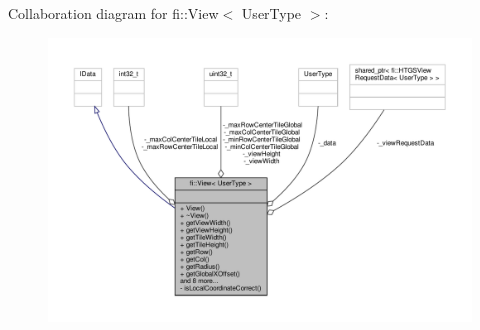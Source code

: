 Collaboration diagram for fi\+:\+:View$<$ User\+Type $>$\+:
\nopagebreak
\begin{figure}[H]
\begin{center}
\leavevmode
\includegraphics[width=350pt]{d6/dcc/classfi_1_1View__coll__graph}
\end{center}
\end{figure}
